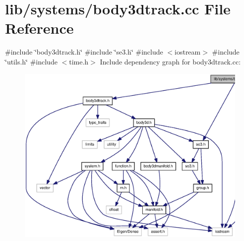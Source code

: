 \section{lib/systems/body3dtrack.cc \-File \-Reference}
\label{body3dtrack_8cc}
{\ttfamily \#include \char`\"{}body3dtrack.\-h\char`\"{}}\*
{\ttfamily \#include \char`\"{}se3.\-h\char`\"{}}\*
{\ttfamily \#include $<$iostream$>$}\*
{\ttfamily \#include \char`\"{}utils.\-h\char`\"{}}\*
{\ttfamily \#include $<$time.\-h$>$}\*
\-Include dependency graph for body3dtrack.\-cc\-:
\nopagebreak
\begin{figure}[H]
\begin{center}
\leavevmode
\includegraphics[width=350pt]{body3dtrack_8cc__incl}
\end{center}
\end{figure}
